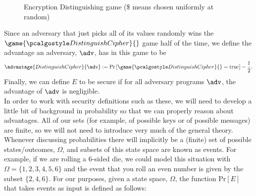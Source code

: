 \documentclass[12pt]{article}
\newcommand{\pr}[1]{\text{Pr}\left[#1\right]}
\theoremstyle{definition}
\theoremstyle{remark}
\theoremstyle{definition}
\begin{document}
\begin{figure}[tbhp]
  \begin{minipage}[t]{0.5\textwidth}\begin{flushright}
    \begin{tcolorbox}[width=5cm]
      \begin{pchstack}[center]
      \end{pchstack}
    \end{tcolorbox}\end{flushright}\end{minipage}\begin{minipage}[t]{0.5\textwidth}
    \begin{tcolorbox}[width=5cm]
      \begin{pchstack}[center]
      \end{pchstack}
    \end{tcolorbox}
  \end{minipage}
  \caption{Encryption Distinguishing game (\$ means chosen uniformly at random)\label{fig:semantic_secure}}
\end{figure}

Since an adversary that just picks all of its values randomly wins the $\game{\algo{DistinguishCipher}}{}$ game half of the time, we define the advantage an adversary, $\adv$, has in this game to be $$\advantage{DistinguishCipher}{\adv} := \pr{\game{\algo{DistinguishCipher}}{} = \text{true}} - \frac{1}{2}.$$ Finally, we can define $E$ to be secure if for all adversary programs $\adv$, the advantage of $\adv$ is negligible.\\

In order to work with security definitions such as these, we will need to develop a little bit of background in probability so that we can properly reason about advantages. All of our sets (for example, of possible keys or of possible messages) are finite, so we will not need to introduce very much of the general theory. Whenever discussing probabilities there will implicitly be a (finite) set of possible states/outcomes, $\Omega$, and subsets of this state space are known as events. For example, if we are rolling a $6$-sided die, we could model this situation with $\Omega = \{1,2,3,4,5,6\}$ and the event that you roll an even number is given by the subset $\{2,4,6\}$. For our purposes, given a state space, $\Omega$, the function $\pr{E}$ that takes events as input is defined as follows:
\end{document}
